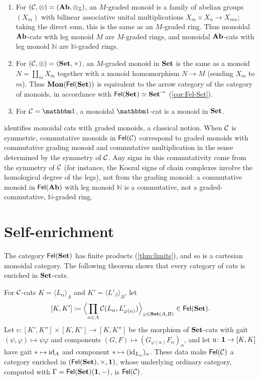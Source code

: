 \begin{example}\label{ex:graded}
\begin{enumerate}
\item For $(\mathcal{C},\otimes)=(\mathbf{Ab},\otimes_{\mathbb Z})$, an $M$-graded monoid is
  a family of abelian groups $(X_m)$ with bilinear associative unital
  multiplications $X_m\times X_n\to X_{mn}$; taking the direct sum, this is the
  same as an $M$-graded ring. Thus monoidal $\mathbf{Ab}$-cats with leg monoid $M$ are
  $M$-graded rings, and monoidal $\mathbf{Ab}$-cats with leg monoid $\mathbb N$ are
  $\mathbb N$-graded rings.
\item For $(\mathcal{C},\otimes)=(\mathbf{Set},\times)$, an $M$-graded monoid in $\mathbf{Set}$ is the
  same as a monoid $N=\coprod_mX_m$ together with a monoid homomorphism $N\to M$
  (sending $X_m$ to $m$). Thus $\mathbf{Mon}(\mathsf{Fel}(\mathbf{Set}))$ is equivalent to the arrow
  category of the category of monoids, in accordance with $\mathsf{Fel}(\mathbf{Set})\simeq\mathbf{Set}^{\to}$
  (\cref{cor:Fel-Set}).
\item For $\cC=\one$, a monoidal $\one$-cat is a monoid in $\mathbf{Set}$.
\end{enumerate}
\end{example}

\begin{remark}\label{rem:graded-honest}
 identifies monoidal cats with graded monoids, a
classical notion. When $\mathcal{C}$ is symmetric, commutative monoids in $\mathsf{Fel}(\mathcal{C})$
correspond to graded monoids with commutative grading monoid and commutative
multiplication in the sense determined by the symmetry of $\mathcal{C}$. Any signs
in this commutativity come from the symmetry of $\mathcal{C}$ (for instance, the
Koszul signs of chain complexes involve the homological degree of the legs),
not from the grading monoid: a commutative monoid in $\mathsf{Fel}(\mathbf{Ab})$ with leg
monoid $\mathbb N$ is a commutative, not a graded-commutative, $\mathbb N$-graded
ring.
\end{remark}

\section{Self-enrichment}\label{sec:self-enrichment}

The category $\mathsf{Fel}(\mathbf{Set})$ has finite products (\cref{thm:limits}), and so is a
cartesian monoidal category. The following theorem shows that every category
of cats is enriched in $\mathbf{Set}$-cats.

\begin{theorem}\label{thm:self-enrichment}
For $\mathcal{C}$-cats $K=\langle L_\alpha\rangle_A$ and $K'=\langle L'_\beta\rangle_B$, let
\[
[K,K']\coloneqq\Bigl\langle\prod_{\alpha\in A}\mathcal{C}(L_\alpha,L'_{\varphi(\alpha)})\Bigr\rangle_{\varphi\in\mathbf{Set}(A,B)}\in\mathsf{Fel}(\mathbf{Set}).
\]
Let $\mathrm c\colon[K',K'']\times[K,K']\to[K,K'']$ be the morphism of
$\mathbf{Set}$-cats with gait $(\psi,\varphi)\mapsto\psi\varphi$ and components
$(G,F)\mapsto(G_{\varphi(\alpha)}F_\alpha)_\alpha$, and let
$\mathrm u\colon\mathbf{1}\to[K,K]$ have gait $*\mapsto\mathrm{id}_A$ and component
$*\mapsto(\mathrm{id}_{L_\alpha})_\alpha$. These data make $\mathsf{Fel}(\mathcal{C})$ a category
enriched in $(\mathsf{Fel}(\mathbf{Set}),\times,\mathbf{1})$, whose underlying ordinary category,
computed with $\Gamma=\mathsf{Fel}(\mathbf{Set})(\mathbf{1},-)$, is $\mathsf{Fel}(\mathcal{C})$.
\end{theorem}

